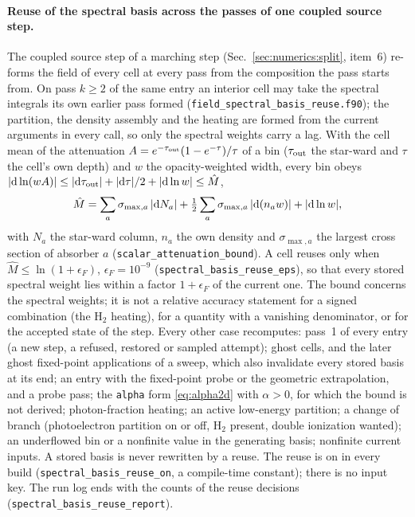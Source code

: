 \paragraph{Reuse of the spectral basis across the passes of one coupled
source step.}  The coupled source step of a marching step
(Sec.~\ref{sec:numerics:split}, item~6) re-forms the field of every cell at
every pass from the composition the pass starts from.  On pass $k\ge2$ of the
same entry an interior cell may take the spectral integrals its own earlier
pass formed (\texttt{field\_spectral\_basis\_reuse.f90}); the partition, the
density assembly and the heating are formed from the current arguments in
every call, so only the spectral weights carry a lag.  With the cell mean of
the attenuation $A = e^{-\tau_{\rm out}}(1-e^{-\tau})/\tau$ of a bin
($\tau_{\rm out}$ the star-ward and $\tau$ the cell's own depth) and $w$ the
opacity-weighted width, every bin obeys $|{\rm d}\ln(w A)| \le |{\rm
d}\tau_{\rm out}| + |{\rm d}\tau|/2 + |{\rm d}\ln w| \le \hat M$,
%
\begin{equation}
  \hat M = \sum_a \sigma_{\max,a}\,|{\rm d}N_a|
         + \tfrac12\sum_a \sigma_{\max,a}\,|{\rm d}(n_a w)|
         + |{\rm d}\ln w|,
  \label{eq:rad:basisbound}
\end{equation}
%
with $N_a$ the star-ward column, $n_a$ the own density and $\sigma_{\max,a}$
the largest cross section of absorber $a$ (\texttt{scalar\_attenuation\_bound}).
A cell reuses only when $\hat M \le \ln(1+\epsilon_F)$,
$\epsilon_F = 10^{-9}$ (\texttt{spectral\_basis\_reuse\_eps}), so that every
stored spectral weight lies within a factor $1+\epsilon_F$ of the current
one.  The bound concerns the spectral weights; it is not a relative accuracy
statement for a signed combination (the H$_2$ heating), for a quantity with
a vanishing denominator, or for the accepted state of the step.  Every other
case recomputes: pass~1 of every entry (a new step, a refused, restored or
sampled attempt); ghost cells, and the later ghost fixed-point applications
of a sweep, which also invalidate every stored basis at its end; an entry with
the fixed-point probe or the geometric extrapolation, and a probe pass;
the \texttt{alpha} form \eqref{eq:alpha2d} with $\alpha>0$, for which the
bound is not derived; photon-fraction heating; an active low-energy partition; a change
of branch (photoelectron partition on or off, H$_2$ present, double
ionization wanted); an underflowed bin or a nonfinite value in the generating
basis; nonfinite current inputs.  A stored basis is never rewritten by a
reuse.  The reuse is on in every build (\texttt{spectral\_basis\_reuse\_on},
a compile-time constant); there is no input key.  The run log ends with the
counts of the reuse decisions (\texttt{spectral\_basis\_reuse\_report}).


